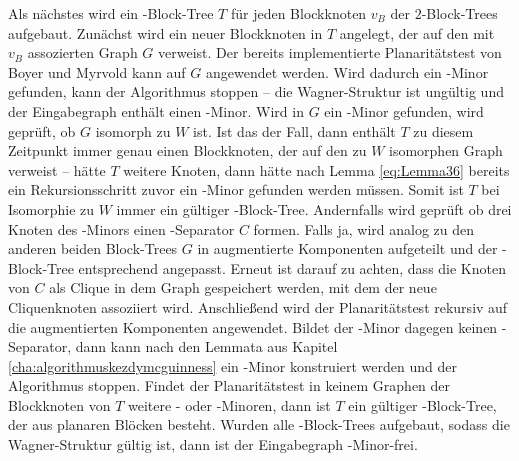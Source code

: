 Als nächstes wird ein \dd-Block-Tree $T$ für jeden Blockknoten $v_B$ der $2$-Block-Trees aufgebaut.
Zunächst wird ein neuer Blockknoten in $T$ angelegt, der auf den mit $v_B$ assozierten Graph $G$ verweist.
Der bereits implementierte Planaritätstest von Boyer und Myrvold \cite{BoM04} kann auf $G$ angewendet werden.
Wird dadurch ein \kf-Minor gefunden, kann der Algorithmus stoppen -- die Wagner-Struktur ist ungültig und der Eingabegraph enthält einen \kf-Minor.
Wird in $G$ ein \kdd-Minor gefunden, wird geprüft, ob $G$ isomorph zu $W$ ist.
Ist das der Fall, dann enthält $T$ zu diesem Zeitpunkt immer genau einen Blockknoten, der auf den zu $W$ isomorphen Graph verweist -- hätte $T$ weitere Knoten, dann hätte nach Lemma \ref{eq:Lemma36} bereits ein Rekursionsschritt zuvor ein \kf-Minor gefunden werden müssen.
Somit ist $T$ bei Isomorphie zu $W$ immer ein gültiger \dd-Block-Tree.
Andernfalls wird geprüft ob drei Knoten des \kdd-Minors einen \dd-Separator $C$ formen.
Falls ja, wird analog zu den anderen beiden Block-Trees $G$ in augmentierte Komponenten aufgeteilt und der \dd-Block-Tree entsprechend angepasst.
Erneut ist darauf zu achten, dass die Knoten von $C$ als Clique in dem Graph gespeichert werden, mit dem der neue Cliquenknoten assoziiert wird.
Anschließend wird der Planaritätstest rekursiv auf die augmentierten Komponenten angewendet.
Bildet der \kdd-Minor dagegen keinen \dd-Separator, dann kann nach den Lemmata aus Kapitel \ref{cha:algorithmuskezdymcguinness} ein \kf-Minor konstruiert werden und der Algorithmus stoppen.
Findet der Planaritätstest in keinem Graphen der Blockknoten von $T$ weitere \kf- oder \kdd-Minoren, dann ist $T$ ein gültiger \dd-Block-Tree, der aus planaren Blöcken besteht.
Wurden alle \dd-Block-Trees aufgebaut, sodass die Wagner-Struktur gültig ist, dann ist der Eingabegraph \kf-Minor-frei.

